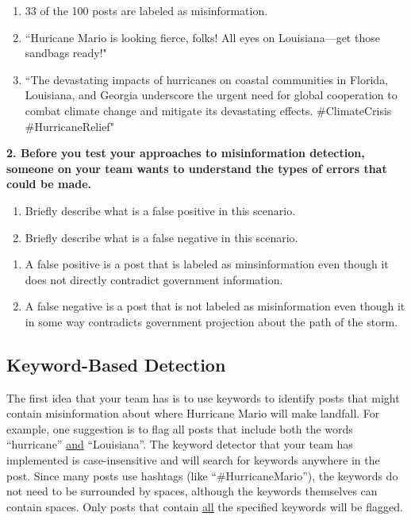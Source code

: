 \documentclass{article}
\begin{document}
\bigskip
\begin{mdframed}
\begin{enumerate}[label=\Alph*.]
    \item 33 of the 100 posts are labeled as misinformation.
    \item ``Huricane Mario is looking fierce, folks! All eyes on Louisiana—get those sandbags ready!"
    \item ``The devastating impacts of hurricanes on coastal communities in Florida, Louisiana, and Georgia underscore the urgent need for global cooperation to combat climate change and mitigate its devastating effects. \#ClimateCrisis \#HurricaneRelief"
\end{enumerate}
\end{mdframed}
\bigskip

\textbf{2. Before you test your approaches to misinformation detection, someone on your team wants to understand the types of errors that could be made.} 
\begin{enumerate}[label=\Alph*.]
    \item Briefly describe what is a false positive in this scenario. 
    \item Briefly describe what is a false negative in this scenario.
\end{enumerate}

\bigskip
\begin{mdframed}
\begin{enumerate}[label=\Alph*.]
    \item A false positive is a post that is labeled as minsinformation even though it does not directly contradict government information. 
    \item A false negative is a post that is not labeled as misinformation even though it in some way contradicts government projection about the path of the storm.
\end{enumerate}
\end{mdframed}
\bigskip

\subsection*{Keyword-Based Detection}

The first idea that your team has is to use keywords to identify posts that might contain misinformation about where Hurricane Mario will make landfall. For example, one suggestion is to flag all posts that include both the words ``hurricane'' \underline{and} ``Louisiana''. The keyword detector that your team has implemented is case-insensitive and will search for keywords anywhere in the post. Since many posts use hashtags (like ``\#HurricaneMario''), the keywords do not need to be surrounded by spaces, although the keywords themselves can contain spaces. Only posts that contain \underline{all} the specified keywords will be flagged. 
\end{document}
